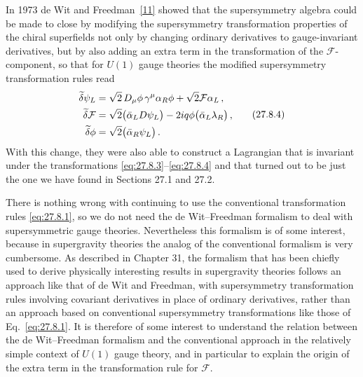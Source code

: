 In 1973 de Wit and Freedman~\hyperref[ch27-ref-11]{[11]} showed that the
supersymmetry algebra could be made to close by modifying the supersymmetry
transformation properties of the chiral superfields not only by changing
ordinary derivatives to gauge-invariant derivatives, but by also adding an
extra term in the transformation of the \(\mathcal{F}\)-component, so that
for \(U(1)\) gauge theories the modified supersymmetry transformation rules
read
\begin{equation}
  \begin{aligned}
    \widetilde{\delta}\psi_L
    &=\sqrt{2}\,D_\mu\phi\,\gamma^\mu\alpha_R\phi
      +\sqrt{2}\mathcal{F}\alpha_L\,,\\
    \widetilde{\delta}\mathcal{F}
    &=\sqrt{2}\bigl(\bar\alpha_L\sl{D}\psi_L\bigr)
      -2iq\phi\bigl(\bar\alpha_L\lambda_R\bigr)\,,\\
    \widetilde{\delta}\phi
    &=\sqrt{2}\bigl(\bar\alpha_R\psi_L\bigr)\,.
  \end{aligned}
  \tag{27.8.4}\label{eq:27.8.4}
\end{equation}
With this change, they were also able to construct a Lagrangian that is
invariant under the transformations \eqref{eq:27.8.3}--\eqref{eq:27.8.4}
and that turned out to be just the one we have found in Sections 27.1 and
27.2.

There is nothing wrong with continuing to use the conventional
transformation rules \eqref{eq:27.8.1}, so we do not need the de
Wit--Freedman formalism to deal with supersymmetric gauge theories.
Nevertheless this formalism is of some interest, because in supergravity
theories the analog of the conventional formalism is very cumbersome. As
described in Chapter 31, the formalism that has been chiefly used to derive
physically interesting results in supergravity theories follows an approach
like that of de Wit and Freedman, with supersymmetry transformation rules
involving covariant derivatives in place of ordinary derivatives, rather
than an approach based on conventional supersymmetry transformations like
those of Eq.~\eqref{eq:27.8.1}. It is therefore of some interest to
understand the relation between the de Wit--Freedman formalism and the
conventional approach in the relatively simple context of \(U(1)\) gauge
theory, and in particular to explain the origin of the extra term in the
transformation rule for \(\mathcal{F}\).

